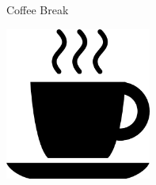 \documentclass[a4paper]{article}
\begin{document}
\printGenericVSLHeader
\begin{center}
    \vspace{-2cm}
\begin{vsltext}{3cm}{4cm}

    \vspace{0.5cm}

    Coffee Break

    \vspace{0.5cm}

    \includegraphics[height=5cm, keepaspectratio=true]{coffeecup.png}


\end{vsltext}

\end{center}
\end{document}

